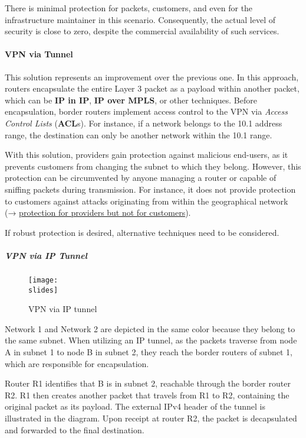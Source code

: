 There is minimal protection for packets, customers, and even for the infrastructure maintainer in this scenario. Consequently, the actual level of security is close to zero, despite the commercial availability of such services.


\paragraph{VPN via Tunnel}


This solution represents an improvement over the previous one. In this approach, routers encapsulate the entire Layer 3 packet as a payload within another packet, which can be \textbf{IP in IP}, \textbf{IP over MPLS}, or other techniques. Before encapsulation, border routers implement access control to the VPN via \textit{Access Control Lists} (\textbf{ACL}s). For instance, if a network belongs to the 10.1 address range, the destination can only be another network within the 10.1 range.

With this solution, providers gain protection against malicious end-users, as it prevents customers from changing the subnet to which they belong.
However, this protection can be circumvented by anyone managing a router or capable of sniffing packets during transmission. For instance, it does not provide protection to customers against attacks originating from within the geographical network (→ \ul{protection for providers but not for customers}).

If robust protection is desired, alternative techniques need to be considered.


\subparagraph{VPN via IP Tunnel}

\begin{figure}[h]
    \centering
    \texttt{[image: \\slides]}
    \caption{VPN via IP tunnel}
\end{figure}

Network 1 and Network 2 are depicted in the same color because they belong to the same subnet. When utilizing an IP tunnel, as the packets traverse from node A in subnet 1 to node B in subnet 2, they reach the border routers of subnet 1, which are responsible for encapsulation.

Router R1 identifies that B is in subnet 2, reachable through the border router R2. R1 then creates another packet that travels from R1 to R2, containing the original packet as its payload. The external IPv4 header of the tunnel is illustrated in the diagram. Upon receipt at router R2, the packet is decapsulated and forwarded to the final destination.

